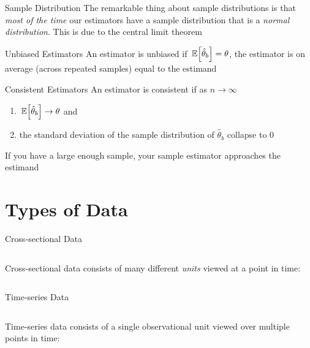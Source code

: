 \documentclass[aspectratio=169,t,11pt,table]{beamer}
\begin{document}
\begin{frame}{Sample Distribution}
  The remarkable thing about sample distributions is that \emph{most of the time} our estimators have a sample distribution that is a \emph{normal distribution}. This is due to the \alert{central limit theorem}
\end{frame}

\begin{frame}{Unbiased Estimators}
  An estimator is \alert{unbiased} if $\expec{\hat{\theta}_b} = \theta$, the estimator is on average (across repeated samples) equal to the estimand
\end{frame}

\begin{frame}{Consistent Estimators}
  An estimator is \alert{consistent} if as $n \to \infty$
  \begin{enumerate}
    \item $\expec{\hat{\theta}_b} \to \theta$ and
    \item the standard deviation of the sample distribution of $\hat{\theta}_b$ collapse to $0$
  \end{enumerate} 

  \bigskip
  If you have a large enough sample, your sample estimator approaches the estimand
\end{frame}



\section{Types of Data}

\begin{frame}{Cross-sectional Data}
  
  \begin{columns}[T]
    \begin{column}{.4\textwidth}
      \alert{Cross-sectional data} consists of many different \emph{units} viewed at a point in time:
    \end{column}
    \begin{column}{.6\textwidth}
      \vspace*{-\bigskipamount}
      
    \end{column}
  \end{columns}
\end{frame}

\begin{frame}{Time-series Data}
  \begin{columns}[T]
    \begin{column}{.4\textwidth}
      \alert{Time-series data} consists of a single observational unit viewed over multiple points in time:
    \end{column}
    \begin{column}{.6\textwidth}
      \vspace*{-\bigskipamount}
      
    \end{column}
  \end{columns}
\end{frame}
\end{document}

